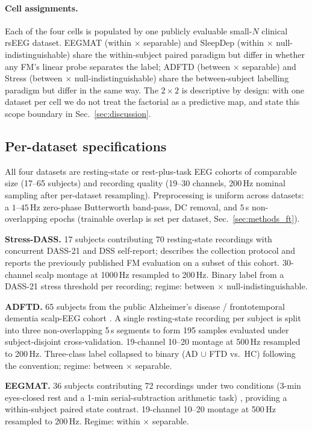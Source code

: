 \paragraph{Cell assignments.} Each of the four cells is populated by
one publicly evaluable small-$N$ clinical rsEEG dataset. EEGMAT
(within $\times$ separable) and SleepDep (within $\times$
null-indistinguishable) share the within-subject paired paradigm but
differ in whether any FM's linear probe separates the label; ADFTD
(between $\times$ separable) and Stress (between $\times$
null-indistinguishable) share the between-subject labelling paradigm
but differ in the same way. The $2\times 2$ is descriptive by design:
with one dataset per cell we do not treat the factorial as a
predictive map, and state this scope boundary in
Sec.~\ref{sec:discussion}.

\subsection{Per-dataset specifications}
\label{sec:methods_datasets}

All four datasets are resting-state or rest-plus-task EEG cohorts of
comparable size (17--65 subjects) and recording quality (19--30
channels, 200\,Hz nominal sampling after per-dataset resampling).
Preprocessing is uniform across datasets: a $1$--$45$\,Hz zero-phase
Butterworth band-pass, DC removal, and $5$\,s non-overlapping epochs
(trainable overlap is set per dataset, Sec.~\ref{sec:methods_ft}).

\textbf{Stress-DASS.} 17 subjects contributing 70 resting-state
recordings with concurrent DASS-21 and DSS self-report;
\citet{komarov2020stress} describes the collection protocol and
\citet{wang2025stress} reports the previously published FM evaluation
on a subset of this cohort. 30-channel scalp montage at 1000\,Hz
resampled to 200\,Hz. Binary label from a DASS-21 stress threshold
per recording; regime: between $\times$ null-indistinguishable.

\textbf{ADFTD.} 65 subjects from the public Alzheimer's disease /
frontotemporal dementia scalp-EEG cohort \citep{adftd}. A single
resting-state recording per subject is split into three non-overlapping
5\,s segments to form 195 samples evaluated under subject-disjoint
cross-validation. 19-channel 10--20 montage at 500\,Hz resampled to
200\,Hz. Three-class label collapsed to binary (AD $\cup$ FTD vs.\ HC)
following the \citet{lead2024} convention; regime: between $\times$
separable.

\textbf{EEGMAT.} 36 subjects contributing 72 recordings under two
conditions (3-min eyes-closed rest and a 1-min serial-subtraction
arithmetic task) \citep{eegmat}, providing a within-subject paired
state contrast. 19-channel 10--20 montage at 500\,Hz resampled to
200\,Hz. Regime: within $\times$ separable.

